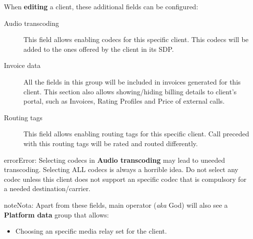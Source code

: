 \documentclass[letterpaper,10pt,spanish]{sphinxmanual}
\begin{document}
When \textbf{editing} a client, these additional fields can be configured:
\begin{description}
\item[{Audio transcoding}] \leavevmode{}\label{administration_portal/brand/clients/wholesale:term-audio-transcoding}
This field allows enabling codecs for this specific client. This codecs will be added to
the ones offered by the client in its SDP.

\item[{Invoice data}] \leavevmode{}\label{administration_portal/brand/clients/wholesale:term-invoice-data}
All the fields in this group will be included in invoices generated for this client. This section also allows
showing/hiding billing details to client's portal, such as Invoices, Rating Profiles and Price of external calls.

\item[{Routing tags}] \leavevmode{}\label{administration_portal/brand/clients/wholesale:term-routing-tags}
This field allows enabling routing tags for this specific client. Call preceded with this
routing tags will be rated and routed differently.

\end{description}

\begin{notice}{error}{Error:}
Selecting codecs in \textbf{Audio transcoding} may lead to uneeded transcoding. Selecting ALL codecs is
always a horrible idea. Do not select any codec unless this client does not support an specific codec
that is compulsory for a needed destination/carrier.
\end{notice}

\begin{notice}{note}{Nota:}
Apart from these fields, main operator (\emph{aka} God) will also see a \textbf{Platform data} group that allows:
\begin{itemize}
\item {} 
Choosing an specific media relay set for the client.

\end{itemize}
\end{notice}
\end{document}
